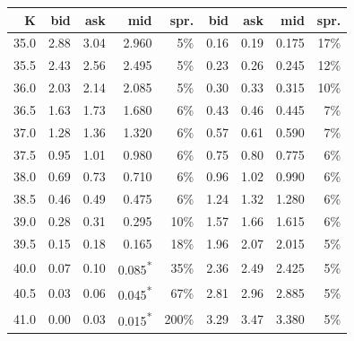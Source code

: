 \begin{center}\small
\begin{tabular}{|r|rrrr|rrrr|}
\hline
K & bid & ask & mid & spr. & bid & ask & mid & spr. \\ \hline
35.0 & 2.88 & 3.04 & 2.960 & 5\% & 0.16 & 0.19 & 0.175 & 17\% \\
35.5 & 2.43 & 2.56 & 2.495 & 5\% & 0.23 & 0.26 & 0.245 & 12\% \\
36.0 & 2.03 & 2.14 & 2.085 & 5\% & 0.30 & 0.33 & 0.315 & 10\% \\
36.5 & 1.63 & 1.73 & 1.680 & 6\% & 0.43 & 0.46 & 0.445 & 7\% \\
37.0 & 1.28 & 1.36 & 1.320 & 6\% & 0.57 & 0.61 & 0.590 & 7\% \\
37.5 & 0.95 & 1.01 & 0.980 & 6\% & 0.75 & 0.80 & 0.775 & 6\% \\
38.0 & 0.69 & 0.73 & 0.710 & 6\% & 0.96 & 1.02 & 0.990 & 6\% \\
38.5 & 0.46 & 0.49 & 0.475 & 6\% & 1.24 & 1.32 & 1.280 & 6\% \\
39.0 & 0.28 & 0.31 & 0.295 & 10\% & 1.57 & 1.66 & 1.615 & 6\% \\
39.5 & 0.15 & 0.18 & 0.165 & 18\% & 1.96 & 2.07 & 2.015 & 5\% \\
40.0 & 0.07 & 0.10 & 0.085\textsuperscript{*} & 35\% & 2.36 & 2.49 & 2.425 & 5\% \\
40.5 & 0.03 & 0.06 & 0.045\textsuperscript{*} & 67\% & 2.81 & 2.96 & 2.885 & 5\% \\
41.0 & 0.00 & 0.03 & 0.015\textsuperscript{*} & 200\% & 3.29 & 3.47 & 3.380 & 5\% \\
\hline
\end{tabular}
\end{center}
